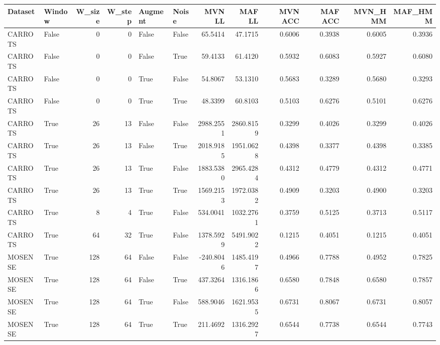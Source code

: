 \documentclass{article}
\begin{document}
\begin{tabular}{llrrllrrrrrr}
	\toprule
	Dataset &  Window &  W\_size &  W\_step &  Augment &  Noise &    MVN LL &    MAF LL &  MVN ACC &  MAF ACC &  MVN\_HMM &  MAF\_HMM \\
	\midrule
	CARROTS &   False &       0 &       0 &    False &  False &   65.5414 &   47.1715 &   0.6006 &   0.3938 &   0.6005 &   0.3936 \\
	CARROTS &   False &       0 &       0 &    False &   True &   59.4133 &   61.4120 &   0.5932 &   0.6083 &   0.5927 &   0.6080 \\
	CARROTS &   False &       0 &       0 &     True &  False &   54.8067 &   53.1310 &   0.5683 &   0.3289 &   0.5680 &   0.3293 \\
	CARROTS &   False &       0 &       0 &     True &   True &   48.3399 &   60.8103 &   0.5103 &   0.6276 &   0.5101 &   0.6276 \\
	CARROTS &    True &      26 &      13 &    False &  False & 2988.2551 & 2860.8159 &   0.3299 &   0.4026 &   0.3299 &   0.4026 \\
	CARROTS &    True &      26 &      13 &    False &   True & 2018.9185 & 1951.0628 &   0.4398 &   0.3377 &   0.4398 &   0.3385 \\
	CARROTS &    True &      26 &      13 &     True &  False & 1883.5380 & 2965.4284 &   0.4312 &   0.4779 &   0.4312 &   0.4771 \\
	CARROTS &    True &      26 &      13 &     True &   True & 1569.2153 & 1972.0382 &   0.4909 &   0.3203 &   0.4900 &   0.3203 \\
	CARROTS &    True &       8 &       4 &     True &  False &  534.0041 & 1032.2761 &   0.3759 &   0.5125 &   0.3713 &   0.5117 \\
	CARROTS &    True &      64 &      32 &     True &  False & 1378.5929 & 5491.9022 &   0.1215 &   0.4051 &   0.1215 &   0.4051 \\
	MOSENSE &    True &     128 &      64 &    False &  False & -240.8046 & 1485.4197 &   0.4966 &   0.7788 &   0.4952 &   0.7825 \\
	MOSENSE &    True &     128 &      64 &    False &   True &  437.3264 & 1316.1866 &   0.6580 &   0.7848 &   0.6580 &   0.7857 \\
	MOSENSE &    True &     128 &      64 &     True &  False &  588.9046 & 1621.9535 &   0.6731 &   0.8067 &   0.6731 &   0.8057 \\
	MOSENSE &    True &     128 &      64 &     True &   True &  211.4692 & 1316.2927 &   0.6544 &   0.7738 &   0.6544 &   0.7743 \\

\end{tabular}
\end{document}
